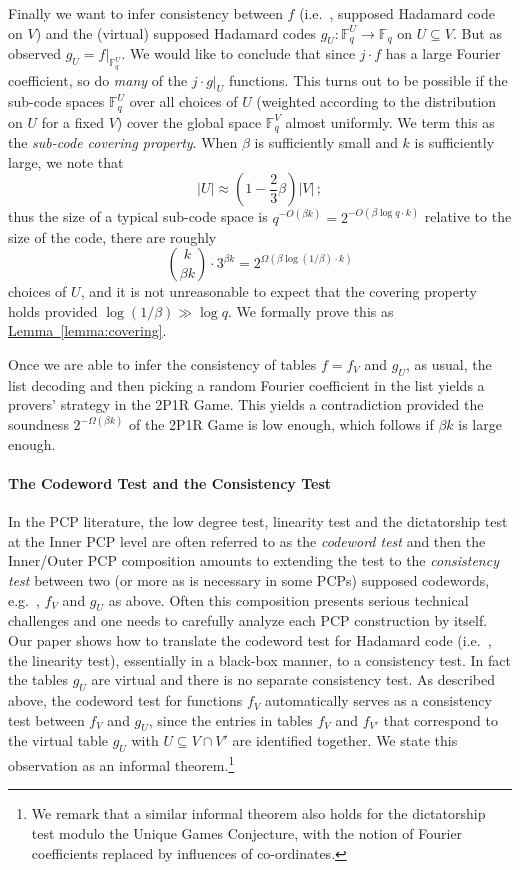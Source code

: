 \documentclass[10pt]{article}
\theoremstyle{definition}
\providecommand{\eg}{e.g.\ }
\providecommand{\ie}{i.e.\ }
\numberwithin{equation}{section}
\newcommand{\expref}[2]{\texorpdfstring{\hyperref[#2]{#1~\ref{#2}}}{#1~\ref{#2}}}
\newcommand\F{\mathbb{F}}
\renewcommand{\mapsto}{\to}
\begin{document}
Finally we want to infer consistency between $f$ (\ie, supposed Hadamard code
on $V$) and the (virtual) supposed Hadamard codes $g_U: \F_q^U \mapsto \F_q$
on $U \subseteq V$. But as observed $g_U = f|_{\F_q^U}$.
We would like to conclude that since $j \cdot f$ has a large Fourier coefficient,
so do \emph{many}  of the $j \cdot g|_U$
functions. This turns out to be  possible if the sub-code spaces
$\F_q^U$ over all choices of $U$ (weighted according to the distribution on $U$ for
a fixed $V$) cover the global space $\F_q^V$ almost uniformly. We term this as
the \emph{sub-code covering property}.
When $\beta$ is sufficiently small and $k$ is
sufficiently large, we note that 
\[
|U| \approx \left(1-\frac{2}{3}\beta\right) |V|\,;
\]
thus the size of
a typical sub-code space is $q^{-O(\beta k)} = 2^{-O(\beta \log q \cdot k)}$
relative to the size of the code, there are roughly 
\[
\binom{k}{\beta  k} \cdot 3^{\beta k}
= 2^{\Omega(\beta \log(1/\beta)\cdot k)}
\]
choices of $U$, and it is
not unreasonable to expect that
the covering property holds provided $\log(1/\beta) \gg \log q$.
We formally prove this as \expref{Lemma}{lemma:covering}.

Once we are able to infer the consistency of tables $f = f_V$ and $g_U$,
as usual, the list decoding and then picking a random Fourier coefficient in the
list yields a provers' strategy in the 2P1R Game. This yields a contradiction
provided the soundness $2^{-\Omega(\beta k)}$ of the 2P1R Game
is low enough, which follows if
$\beta k$ is large enough.

\paragraph{The Codeword Test and the Consistency Test} In the PCP
literature, the low degree test, linearity test and the dictatorship test at the
Inner PCP level
are
often referred to as the \emph{codeword test} and then the Inner/Outer PCP composition
amounts to extending the test to the \emph{consistency test}
between two (or more as is necessary in some PCPs)
supposed codewords, \eg, $f_V$ and $g_U$ as above. Often this composition
presents serious technical challenges and one needs to carefully analyze
each PCP construction by itself. Our paper shows how to translate
the codeword test for Hadamard code (\ie, the linearity test), essentially in a
black-box manner, to a consistency test. In fact the tables $g_U$ are
virtual and there is no separate
consistency test. As described above, the codeword test for functions $f_V$
automatically serves as a consistency test between $f_V$ and $g_U$, since the
entries in tables
$f_V$ and  $f_{V'}$ that correspond to
the virtual table $g_U$ with $U \subseteq V \cap V'$
are identified together. We state this observation as an informal theorem.\footnote{We remark that a similar informal theorem also holds for the dictatorship test
modulo the Unique Games Conjecture, with the notion of Fourier coefficients replaced
by influences of co-ordinates.}
\setcounter{section}{1}
\end{document}
